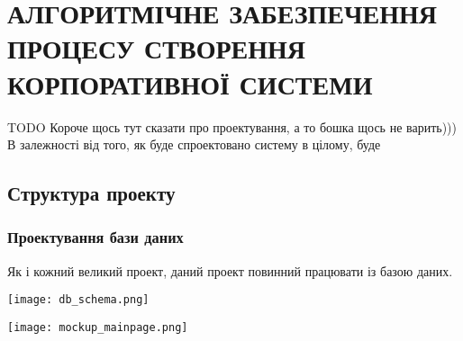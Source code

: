 \section{АЛГОРИТМІЧНЕ ЗАБЕЗПЕЧЕННЯ ПРОЦЕСУ СТВОРЕННЯ КОРПОРАТИВНОЇ СИСТЕМИ}

TODO
Короче щось тут сказати про проектування, а то бошка щось не варить)))
В залежності від того, як буде спроектовано систему в цілому, буде

\subsection{Структура проекту}

\subsubsection{Проектування бази даних}
Як і кожний великий проект, даний проект повинний працювати із базою даних.

\begin{center}
		\texttt{[image: db\_schema.png]}
\end{center}


\begin{center}
		\texttt{[image: mockup\_mainpage.png]}
\end{center}